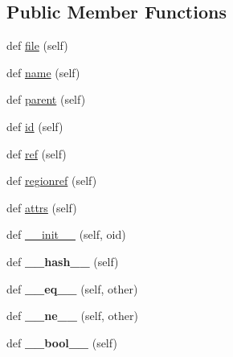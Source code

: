 \subsection*{Public Member Functions}
\begin{DoxyCompactItemize}
\item 
def \hyperlink{classh5py__LOCAL_1_1__hl_1_1base_1_1HLObject_a56d62bd5d2de386daa62f03fcd5c81b8}{file} (self)
\item 
def \hyperlink{classh5py__LOCAL_1_1__hl_1_1base_1_1HLObject_a75703ed103699785a900c90c5a0d5044}{name} (self)
\item 
def \hyperlink{classh5py__LOCAL_1_1__hl_1_1base_1_1HLObject_a90e845990d619d1be2a4a2ca6314e7a0}{parent} (self)
\item 
def \hyperlink{classh5py__LOCAL_1_1__hl_1_1base_1_1HLObject_a4616b3fd6b91706c9088c5a2843fe7e0}{id} (self)
\item 
def \hyperlink{classh5py__LOCAL_1_1__hl_1_1base_1_1HLObject_a2516a991ac2e9e076aff158a952aaf69}{ref} (self)
\item 
def \hyperlink{classh5py__LOCAL_1_1__hl_1_1base_1_1HLObject_a876b715896fcf09cea653a69ba8a5db4}{regionref} (self)
\item 
def \hyperlink{classh5py__LOCAL_1_1__hl_1_1base_1_1HLObject_a363f00e49d396b3b4dc1e1a9699cda0d}{attrs} (self)
\item 
def \hyperlink{classh5py__LOCAL_1_1__hl_1_1base_1_1HLObject_a8a5eec33c2869d06e1d39dddba4eb325}{\+\_\+\+\_\+init\+\_\+\+\_\+} (self, oid)
\item 
\mbox{\label{classh5py__LOCAL_1_1__hl_1_1base_1_1HLObject_a7d5a2451f2917b8cb82b20c4fd930659}} 
def {\bfseries \+\_\+\+\_\+hash\+\_\+\+\_\+} (self)
\item 
\mbox{\label{classh5py__LOCAL_1_1__hl_1_1base_1_1HLObject_a430123905ea6ca0769b9b57ea7d775f3}} 
def {\bfseries \+\_\+\+\_\+eq\+\_\+\+\_\+} (self, other)
\item 
\mbox{\label{classh5py__LOCAL_1_1__hl_1_1base_1_1HLObject_ad4b875fc0bec8da1c32e7331486fdd50}} 
def {\bfseries \+\_\+\+\_\+ne\+\_\+\+\_\+} (self, other)
\item 
\mbox{\label{classh5py__LOCAL_1_1__hl_1_1base_1_1HLObject_a1eb7b4c648dd73c28cea2d0a83351486}} 
def {\bfseries \+\_\+\+\_\+bool\+\_\+\+\_\+} (self)
\end{DoxyCompactItemize}
